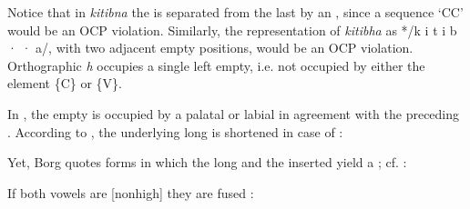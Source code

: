 \documentclass[output=paper]{langsci/langscibook}
\begin{document}
Notice that in \textit{kitibna} the   is separated from the last  by an , since a sequence ‘CC’ would be an OCP violation. Similarly, the representation of \textit{kitibha} as */k i t i b · · a/, with two adjacent empty positions, would be an OCP violation. Orthographic \textit{h} occupies a single  left empty, i.e. not occupied by either the element \{C\} or \{V\}. 


In , the empty  is occupied by a palatal or labial  in agreement with the preceding . According to \citet[275]{Borg1997}, the underlying long  is shortened in case of :


\puechlengths{3cm}{2.8cm}{2cm}{3.5cm}{1.5cm}{1.5cm}

\ea%
\begin{xlist}
\end{xlist}
\z

Yet, Borg quotes  forms in which the long  and the inserted  yield a  ; cf. \citet[87]{Puech1994}:


\ea%
    \label{ex:puech:41}
    \z


If both vowels are [nonhigh] they are fused \citep[276]{Borg1997}:

\ea%
\begin{xlist}
\end{xlist}
\z
\end{document}
